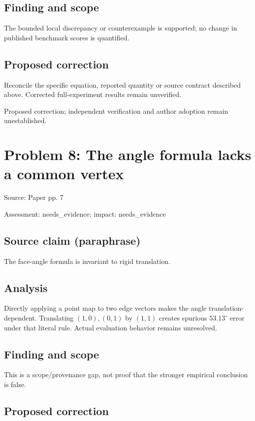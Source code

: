 \documentclass[11pt]{article}
\begin{document}
\subsection*{Finding and scope}

The bounded local discrepancy or counterexample is supported; no change in published benchmark scores is quantified.

\subsection*{Proposed correction}

Reconcile the specific equation, reported quantity or source contract described above. Corrected full-experiment results remain unverified.

Proposed correction; independent verification and author adoption remain unestablished.

\section*{Problem 8: The angle formula lacks a common vertex}

Source: Paper pp. 7

Assessment: needs\_evidence; impact: needs\_evidence

\subsection*{Source claim (paraphrase)}

The face-angle formula is invariant to rigid translation.

\subsection*{Analysis}

Directly applying a point map to two edge vectors makes the angle translation-dependent. Translating \((1,0),(0,1)\) by \((1,1)\) creates spurious \(53.13^\circ\) error under that literal rule. Actual evaluation behavior remains unresolved.

\subsection*{Finding and scope}

This is a scope/provenance gap, not proof that the stronger empirical conclusion is false.

\subsection*{Proposed correction}
\end{document}
